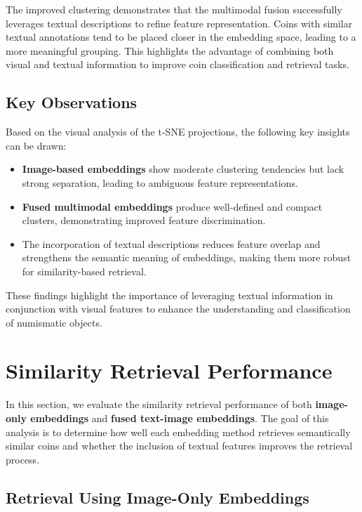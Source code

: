 \documentclass[nolibertine, english, algorithm, nomencl, minted]{ttlab-qualify}
\begin{document}
The improved clustering demonstrates that the multimodal fusion successfully leverages textual descriptions to refine 
feature representation. Coins with similar textual annotations tend to be placed closer in the embedding space, leading to a 
more meaningful grouping. This highlights the advantage of combining both visual and textual information to improve coin 
classification and retrieval tasks.

\subsection{Key Observations}
\label{subsec:tsne_observations}

Based on the visual analysis of the t-SNE projections, the following key insights can be drawn:
\begin{itemize}
    \item \textbf{Image-based embeddings} show moderate clustering tendencies but lack strong separation, leading to ambiguous 
    feature representations.
    \item \textbf{Fused multimodal embeddings} produce well-defined and compact clusters, demonstrating improved feature discrimination.
    \item The incorporation of textual descriptions reduces feature overlap and strengthens the semantic meaning of embeddings, 
    making them more robust for similarity-based retrieval.
\end{itemize}

These findings highlight the importance of leveraging textual information in conjunction with visual features to enhance the 
understanding and classification of numismatic objects.


\section{Similarity Retrieval Performance}
\label{sec:similarity_retrieval}

In this section, we evaluate the similarity retrieval performance of both 
\textbf{image-only embeddings} and \textbf{fused text-image embeddings}. 
The goal of this analysis is to determine how well each embedding method retrieves semantically similar 
coins and whether the inclusion of textual features improves the retrieval process.

\subsection{Retrieval Using Image-Only Embeddings}
\label{subsec:image_retrieval}
\end{document}
